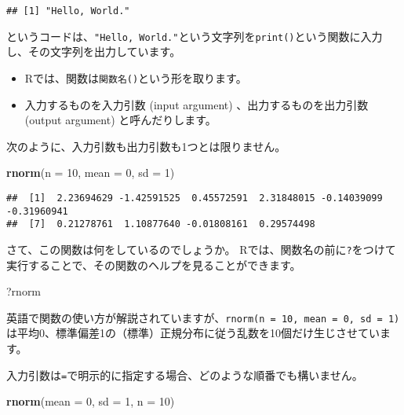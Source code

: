 \documentclass[]{bxjsarticle}
\newenvironment{Shaded}{\begin{snugshade}}{\end{snugshade}}
\newcommand{\DataTypeTok}[1]{\textcolor[rgb]{0.13,0.29,0.53}{#1}}
\newcommand{\DecValTok}[1]{\textcolor[rgb]{0.00,0.00,0.81}{#1}}
\newcommand{\KeywordTok}[1]{\textcolor[rgb]{0.13,0.29,0.53}{\textbf{#1}}}
\newcommand{\NormalTok}[1]{#1}
\providecommand{\tightlist}{%
  \setlength{\itemsep}{0pt}\setlength{\parskip}{0pt}}
\begin{document}
\begin{verbatim}
## [1] "Hello, World."
\end{verbatim}

というコードは、\texttt{"Hello,\ World."}という文字列を\texttt{print()}という関数に入力し、その文字列を出力しています。

\begin{itemize}
\tightlist
\item
  Rでは、関数は\texttt{関数名()}という形を取ります。
\item
  入力するものを入力引数 (input argument) 、出力するものを出力引数 (output argument) と呼んだりします。
\end{itemize}

次のように、入力引数も出力引数も1つとは限りません。

\begin{Shaded}
\begin{Highlighting}[]
\KeywordTok{rnorm}\NormalTok{(}\DataTypeTok{n =} \DecValTok{10}\NormalTok{, }\DataTypeTok{mean =} \DecValTok{0}\NormalTok{, }\DataTypeTok{sd =} \DecValTok{1}\NormalTok{)}
\end{Highlighting}
\end{Shaded}

\begin{verbatim}
##  [1]  2.23694629 -1.42591525  0.45572591  2.31848015 -0.14039099 -0.31960941
##  [7]  0.21278761  1.10877640 -0.01808161  0.29574498
\end{verbatim}

さて、この関数は何をしているのでしょうか。
Rでは、関数名の前に\texttt{?}をつけて実行することで、その関数のヘルプを見ることができます。

\begin{Shaded}
\begin{Highlighting}[]
\NormalTok{?rnorm}
\end{Highlighting}
\end{Shaded}

英語で関数の使い方が解説されていますが、\texttt{rnorm(n\ =\ 10,\ mean\ =\ 0,\ sd\ =\ 1)}は平均0、標準偏差1の（標準）正規分布に従う乱数を10個だけ生じさせています。

入力引数は\texttt{=}で明示的に指定する場合、どのような順番でも構いません。

\begin{Shaded}
\begin{Highlighting}[]
\KeywordTok{rnorm}\NormalTok{(}\DataTypeTok{mean =} \DecValTok{0}\NormalTok{, }\DataTypeTok{sd =} \DecValTok{1}\NormalTok{, }\DataTypeTok{n =} \DecValTok{10}\NormalTok{)}
\end{Highlighting}
\end{Shaded}
\end{document}

